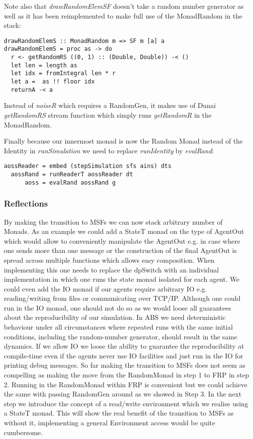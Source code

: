 Note also that \textit{drawRandomElemSF} doesn't take a random number generator as well as it has been reimplemented to make full use of the MonadRandom in the stack:

\begin{verbatim}
drawRandomElemS :: MonadRandom m => SF m [a] a
drawRandomElemS = proc as -> do
  r <- getRandomRS ((0, 1) :: (Double, Double)) -< ()
  let len = length as
  let idx = fromIntegral len * r
  let a =  as !! floor idx
  returnA -< a
\end{verbatim}

Instead of \textit{noiseR} which requires a RandomGen, it makes use of Dunai \textit{getRandomRS} stream function which simply runs \textit{getRandomR} in the MonadRandom.

Finally because our innermost monad is now the Random Monad instead of the Identity in \textit{runSimulation} we need to replace \textit{runIdentity} by \textit{evalRand}:

\begin{verbatim}
aossReader = embed (stepSimulation sfs ains) dts
  aossRand = runReaderT aossReader dt
      aoss = evalRand aossRand g
\end{verbatim}

\subsubsection{Reflections}
By making the transition to MSFs we can now stack arbitrary number of Monads. As an example we could add a StateT monad on the type of AgentOut which would allow to conveniently manipulate the AgentOut e.g. in case where one sends more than one message or the construction of the final AgentOut is spread across multiple functions which allows easy composition. When implementing this one needs to replace the dpSwitch with an individual implementation in which one runs the state monad isolated for each agent.
We could even add the IO monad if our agents require arbitrary IO e.g. reading/writing from files or communicating over TCP/IP. Although one could run in the IO monad, one should not do so as we would loose all guarantees about the reproducibility of our simulation. In ABS we need deterministic behaviour under all circumstances where repeated runs with the same initial conditions, including the random-number generator, should result in the same dynamics. If we allow IO we loose the ability to guarantee the reproducibility at compile-time even if the agents never use IO facilities and just run in the IO for printing debug messages.
So far making the transition to MSFs does not seem as compelling as making the move from the RandomMonad in step 1 to FRP in step 2. Running in the RandomMonad within FRP is convenient but we could achieve the same with passing RandomGen around as we showed in Step 3. In the next step we introduce the concept of a read/write environment which we realise using a StateT monad. This will show the real benefit of the transition to MSFs as without it, implementing a general Environment access would be quite cumbersome.